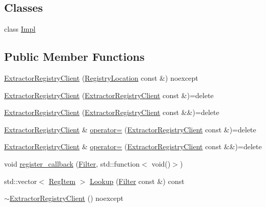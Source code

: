 \subsection*{Classes}
\begin{DoxyCompactItemize}
\item 
class \hyperlink{classregistry_1_1ExtractorRegistryClient_1_1Impl}{Impl}
\end{DoxyCompactItemize}
\subsection*{Public Member Functions}
\begin{DoxyCompactItemize}
\item 
\hyperlink{classregistry_1_1ExtractorRegistryClient_a79e68c10ba8b6721529bf0b1f713f247}{Extractor\+Registry\+Client} (\hyperlink{structregistry_1_1RegistryLocation}{Registry\+Location} const \&) noexcept
\item 
\hyperlink{classregistry_1_1ExtractorRegistryClient_aace253a20f811a9252355809552f4b95}{Extractor\+Registry\+Client} (\hyperlink{classregistry_1_1ExtractorRegistryClient}{Extractor\+Registry\+Client} const \&)=delete
\item 
\hyperlink{classregistry_1_1ExtractorRegistryClient_a6f64a9ce2c92d5184b328720af9836a5}{Extractor\+Registry\+Client} (\hyperlink{classregistry_1_1ExtractorRegistryClient}{Extractor\+Registry\+Client} const \&\&)=delete
\item 
\hyperlink{classregistry_1_1ExtractorRegistryClient}{Extractor\+Registry\+Client} \& \hyperlink{classregistry_1_1ExtractorRegistryClient_ab84f0b91d01ae9dabe0318b771dc3bcf}{operator=} (\hyperlink{classregistry_1_1ExtractorRegistryClient}{Extractor\+Registry\+Client} const \&)=delete
\item 
\hyperlink{classregistry_1_1ExtractorRegistryClient}{Extractor\+Registry\+Client} \& \hyperlink{classregistry_1_1ExtractorRegistryClient_aafbb2652f8aa62f3c6e7dbbb4c72ab68}{operator=} (\hyperlink{classregistry_1_1ExtractorRegistryClient}{Extractor\+Registry\+Client} const \&\&)=delete
\item 
void \hyperlink{classregistry_1_1ExtractorRegistryClient_adc9670838114ce824bf7d79913aa5191}{register\+\_\+callback} (\hyperlink{classregistry_1_1Filter}{Filter}, std\+::function$<$ void()$>$)
\item 
std\+::vector$<$ \hyperlink{classregistry_1_1RegItem}{Reg\+Item} $>$ \hyperlink{classregistry_1_1ExtractorRegistryClient_aae214dba3e9dabd81844e6dfa3958eeb}{Lookup} (\hyperlink{classregistry_1_1Filter}{Filter} const \&) const
\item 
\hyperlink{classregistry_1_1ExtractorRegistryClient_a3c4ecec0c0a4ce7c25c7697889c253d9}{$\sim$\+Extractor\+Registry\+Client} () noexcept
\end{DoxyCompactItemize}
